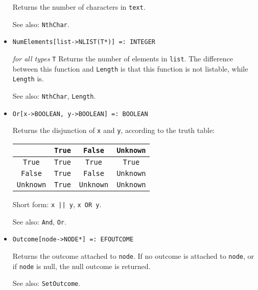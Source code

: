 \begin{itemize}
\bd
Returns the number of characters in \verb+text+.
\item [See also:] \verb+NthChar+.
\ed

\item{}
\protect \large \begin{verbatim}
NumElements[list->NLIST(T*)] =: INTEGER 
\end{verbatim}\normalsize

{\it for all types} {\tt T}
\bd
Returns the number of elements in \verb+list+.  The difference between
this function and \verb+Length+ is that this function is not listable,
while \verb+Length+ is.  
\item
[See also:] \verb+NthChar+, \verb+Length+.
\ed





\item{} 
\protect \large \begin{verbatim}
Or[x->BOOLEAN, y->BOOLEAN] =: BOOLEAN 
\end{verbatim} \normalsize
  
\bd
Returns the disjunction of \verb+x+ and \verb+y+, according to the truth
table:
\begin{center}
\begin{tabular} {|c||c|c|c|} \hline
& \verb+True+ & \verb+False+ & \verb+Unknown+ \\ \hline 
\verb+True+ & \verb+True+ & \verb+True+ & \verb+True+ \\
\verb+False+ & \verb+True+ & \verb+False+ & \verb+Unknown+ \\
\verb+Unknown+ & \verb+True+ & \verb+Unknown+ & \verb+Unknown+ \\ \hline
\end{tabular}
\end{center}
\item
[Short form:] \verb+x || y+, \verb+x OR y+.
\item [See also:] \verb+And+, \verb+Or+.
\ed

\item{}
\protect \large \begin{verbatim}
Outcome[node->NODE*] =: EFOUTCOME 
\end{verbatim}\normalsize

\bd
Returns the outcome attached to \verb+node+.  If no outcome is attached
to \verb+node+, or if \verb+node+ is null, the null outcome is returned.
\item [See also:] \verb+SetOutcome+.
\ed


\end{itemize}
